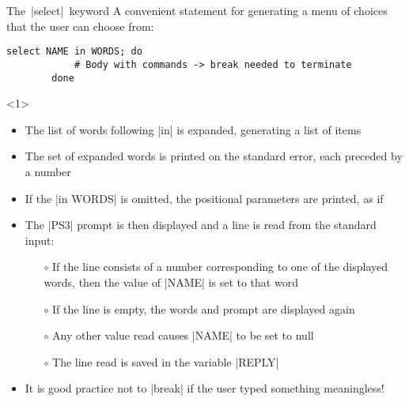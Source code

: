 \begin{frame}[fragile]{The \,\bash|select|\, keyword}
    \vspace{-3mm}
    A convenient statement for generating a menu of choices that the user can choose from:
    \medskip
    \begin{lstlisting}[style=MyBash, numbers=none, belowskip=-5mm]
        select NAME in WORDS; do
            # Body with commands -> break needed to terminate
        done
    \end{lstlisting}
    \vspace{1.5mm}
    \begin{overlayarea}{\textwidth}{\textheight}
        \begin{onlyenv}<1>
            \vspace{1.5mm}
            \begin{itemize}
                \item The list of words following \;\bash|in|\; is expanded, generating a list of items
                \item The set of expanded words is printed on the \alert{standard error}, each preceded by a number
                \item If the \;\bash|in WORDS|\; is omitted, the positional parameters are printed, as if \;
                \item The \;\bash|PS3|\; prompt is then displayed and a line is read from the standard input:
                      \begin{itemize}
                          \item[$\circ$] If the line consists of a number corresponding to one of the displayed words, then the value of \;\bash|NAME|\; is set to that word
                          \item[$\circ$] If the line is empty, the words and prompt are displayed again
                          \item[$\circ$] Any other value read causes \;\bash|NAME|\; to be set to null
                          \item[$\circ$] The line read is saved in the variable \;\bash|REPLY|
                      \end{itemize}
                \item It is good practice not to \;\bash|break|\; if the user typed something meaningless!
            \end{itemize}
        \end{onlyenv}

\end{overlayarea}
\end{frame}
